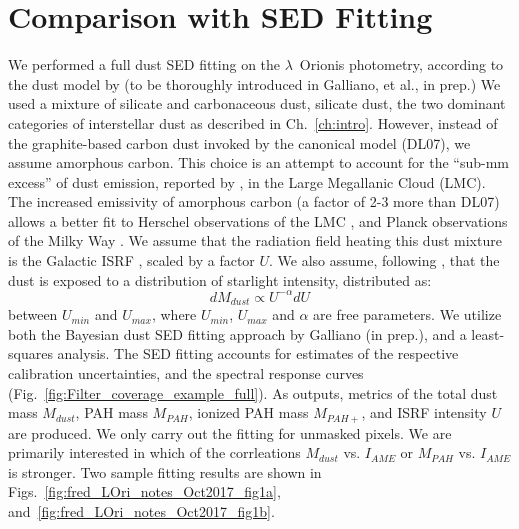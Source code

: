         \section{Comparison with SED Fitting}
          We performed a full dust SED fitting on the $\lambda$~Orionis photometry, according to the dust model by \cite{galliano11} (to be thoroughly introduced in Galliano, et al., in prep.)  We used a mixture of silicate and carbonaceous dust, silicate dust, the two dominant categories of interstellar dust as described in Ch.~\ref{ch:intro}. However, instead of the graphite-based carbon dust invoked by the canonical \cite{draine07} model (DL07), we assume amorphous carbon. This choice is an attempt to account for the ``sub-mm excess'' of dust emission, reported by \cite{israel10, bot10}, in the Large Megallanic Cloud (LMC). The increased emissivity of amorphous carbon (a factor of 2-3 more than DL07) allows a better fit to Herschel observations of the LMC \citep{galliano11}, and Planck observations of the Milky Way \citep{planckIntXXIX16}. We assume that the radiation field heating this dust mixture is the Galactic ISRF \citep{mathis83}, scaled by a factor $U$. We also assume, following \cite{dale01}, that the dust is exposed to a distribution of starlight intensity, distributed as:
              \begin{equation}
                 \label{eq:U}
                   dM_{dust}\propto{} U^{-\alpha}dU
              \end{equation}
          between $U_{min}$ and $U_{max}$, where $U_{min}$, $U_{max}$ and $\alpha{}$ are free parameters.
          We utilize both the Bayesian dust SED fitting approach by Galliano (in prep.), and a least-squares analysis. The SED fitting accounts for estimates of the respective calibration uncertainties, and the spectral response curves (Fig.~\ref{fig:Filter_coverage_example_full}). As outputs, metrics of the total dust mass $M_{dust}$, PAH mass $M_{PAH}$, ionized PAH mass $M_{PAH+}$, and ISRF intensity $U$ are produced. We only carry out the fitting for unmasked pixels. We are primarily interested in which of the corrleations $M_{dust}$ vs. $I_{AME}$ or $M_{PAH}$ vs. $I_{AME}$ is stronger.
          Two sample fitting results are shown in Figs.~\ref{fig:fred_LOri_notes_Oct2017_fig1a}, and~\ref{fig:fred_LOri_notes_Oct2017_fig1b}.
